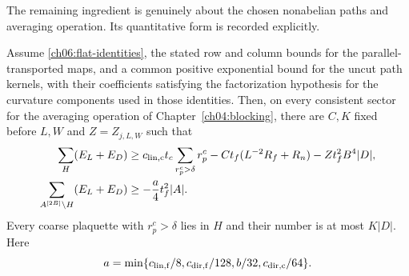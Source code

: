 The remaining ingredient is genuinely about the chosen nonabelian paths
and averaging operation. Its quantitative form is recorded explicitly.
\begin{proposition}
\label{ch06:signed-input}
Assume \eqref{ch06:flat-identities}, the stated row and column
bounds for the parallel-transported maps, and a common positive exponential bound for the uncut path
kernels, with their coefficients satisfying the factorization hypothesis for the curvature components used
in those identities. Then, on every consistent sector for the averaging operation
of Chapter~\ref{ch04:blocking}, there are $C,K$ fixed before $L,W$ and
$Z=Z_{j,L,W}$ such that
\begin{align}
 \sum_H(E_L+E_D)&\ge
 c_{\rm lin,c}t_c\sum_{r_p^c>\delta}r_p^c
       -Ct_f(L^{-2}R_f+R_n)-Zt_f^2B^4|D|,
 \label{ch06:affected}\\
 \sum_{A^{[2B]}\setminus H}(E_L+E_D)&\ge
                                  -\frac a4t_f^2|A|.
 \label{ch06:unaffected}
\end{align}
Every coarse plaquette with $r_p^c>\delta$ lies in $H$ and their number
is at most $K|D|$. Here
\[
 a=\min\{c_{\rm lin,f}/8,c_{\rm dir,f}/128,b/32,c_{\rm dir,c}/64\}.
\]
\end{proposition}

